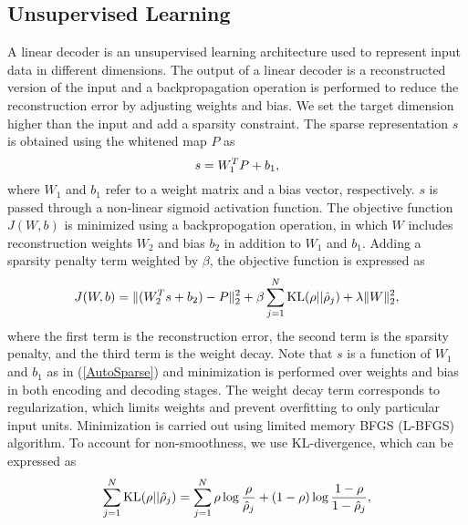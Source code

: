 \documentclass[draftcls,12pt, onecolumn]{IEEEtran}
\begin{document}
\subsection{Unsupervised Learning}
A linear decoder is an unsupervised learning architecture used to represent input data in different dimensions. The output of a linear decoder is a reconstructed version of the input and a backpropagation operation is performed to reduce the reconstruction error by adjusting weights and bias. We set the target dimension higher than the input and add a sparsity constraint. The sparse representation $s$ is obtained using the whitened map $P$ as 
\vspace{-3.5mm}
\begin{equation}\label{AutoSparse}
s = W_1^T P + b_1,
\vspace{-1.5mm}
\end{equation}
where $W_1$ and $b_1$ refer to a weight matrix and a bias vector, respectively. $s$ is passed through a non-linear sigmoid activation function.  The objective function $J(W,b)$ is minimized using a backpropogation operation, in which $W$ includes reconstruction weights $W_2$ and bias $b_2$ in addition to $W_1$ and $b_1$. Adding a sparsity penalty term weighted by $\beta$, the objective function is expressed as
\vspace{-3.0mm}
\begin{equation} \label{decoder_cost}
	J(W,b) = \lVert (W_2^Ts + b_2) - P \rVert_2^2 + \beta \sum_{j=1}^{N} {\rm KL}(\rho || \hat\rho_j) + \lambda\lVert W \rVert_2^2,
\vspace{-0.5mm}
\end{equation}
where the first term is the reconstruction error, the second term is the sparsity penalty, and the third term is the weight decay. Note that $s$ is a function of $W_1$ and $b_1$ as in (\ref{AutoSparse}) and minimization is performed over weights and bias in both encoding and decoding stages. The weight decay term corresponds to regularization, which limits weights and prevent overfitting to only particular input units. Minimization is carried out using limited memory BFGS (L-BFGS) algorithm. To account for non-smoothness, we use KL-divergence, which can be expressed as 
\vspace{-2.0mm}
\begin{equation} \label{kl_divergence}
\sum_{j=1}^{N} {\rm KL}(\rho || \hat\rho_j) = \sum_{j=1}^{N} \rho \log \frac{\rho}{\hat\rho_j} + (1-\rho) \log \frac{1-\rho}{1-\hat\rho_j},
\vspace{-1.0mm}
\end{equation}
\end{document}
